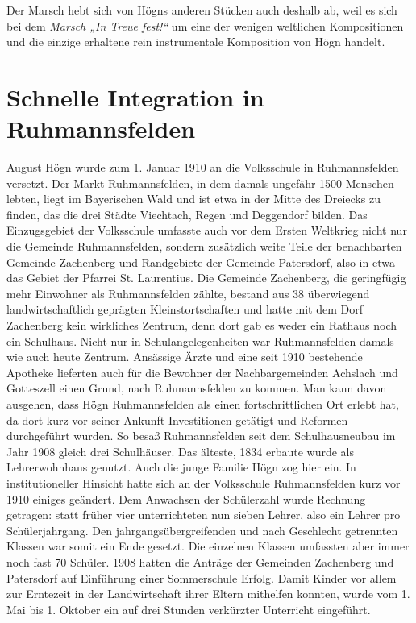 \documentclass{book}
\begin{document}
Der Marsch hebt sich von Högns anderen Stücken auch deshalb ab, weil es
sich bei dem \textit{Marsch „In Treue fest!“} um eine der wenigen
weltlichen Kompositionen und die einzige erhaltene rein instrumentale
Komposition von Högn handelt.

\section{Schnelle Integration in Ruhmannsfelden}

August Högn wurde zum 1. Januar 1910 an die Volksschule in
Ruhmannsfelden versetzt. Der Markt Ruhmannsfelden, in dem damals
ungefähr 1500 Menschen lebten, liegt im Bayerischen Wald und ist etwa
in der Mitte des Dreiecks zu finden, das die drei Städte Viechtach,
Regen und Deggendorf bilden. Das Einzugsgebiet der Volksschule umfasste
auch vor dem Ersten Weltkrieg nicht nur die Gemeinde Ruhmannsfelden,
sondern zusätzlich weite Teile der benachbarten Gemeinde Zachenberg
und Randgebiete der Gemeinde Patersdorf, also in etwa das Gebiet der
Pfarrei St. Laurentius. Die Gemeinde Zachenberg, die geringfügig mehr
Einwohner als Ruhmannsfelden zählte, bestand aus 38 überwiegend
landwirtschaftlich geprägten Kleinstortschaften und hatte mit dem Dorf
Zachenberg kein wirkliches Zentrum, denn dort gab es weder ein Rathaus
noch ein Schulhaus. Nicht nur in Schulangelegenheiten war
Ruhmannsfelden damals wie auch heute Zentrum. Ansässige Ärzte und eine
seit 1910 bestehende Apotheke lieferten auch für die Bewohner der
Nachbargemeinden Achslach und Gotteszell einen Grund, nach
Ruhmannsfelden zu kommen. Man kann davon ausgehen, dass Högn
Ruhmannsfelden als einen fortschrittlichen Ort erlebt hat, da dort kurz
vor seiner Ankunft Investitionen getätigt und Reformen durchgeführt
wurden. So besaß Ruhmannsfelden seit dem Schulhausneubau im Jahr 1908
gleich drei Schulhäuser. Das älteste, 1834 erbaute wurde als
Lehrerwohnhaus genutzt. Auch die junge Familie Högn zog hier ein. In
institutioneller Hinsicht hatte sich an der Volksschule Ruhmannsfelden
kurz vor 1910 einiges geändert. Dem Anwachsen der Schülerzahl wurde
Rechnung getragen: statt früher vier unterrichteten nun sieben Lehrer,
also ein Lehrer pro Schülerjahrgang. Den jahrgangsübergreifenden und
nach Geschlecht getrennten Klassen war somit ein Ende gesetzt. Die
einzelnen Klassen umfassten aber immer noch fast 70 Schüler. 1908
hatten die Anträge der Gemeinden Zachenberg und Patersdorf auf
Einführung einer Sommerschule Erfolg. Damit Kinder vor allem zur
Erntezeit in der Landwirtschaft ihrer Eltern mithelfen konnten, wurde
vom 1. Mai bis 1. Oktober ein auf drei Stunden verkürzter Unterricht
eingeführt.
\end{document}
